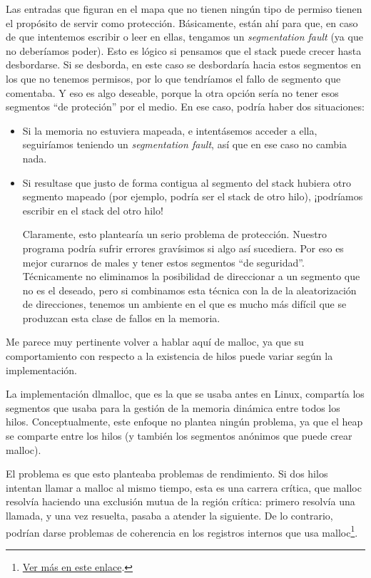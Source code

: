 \documentclass[a4paper]{article}
\begin{document}
Las entradas que figuran en el mapa que no tienen ningún tipo de permiso tienen el propósito de servir como protección. Básicamente, están ahí para que, en caso de que intentemos escribir o leer en ellas, tengamos un \emph{segmentation fault} (ya que no deberíamos poder). Esto es lógico si pensamos que el stack puede crecer hasta desbordarse. Si se desborda, en este caso se desbordaría hacia estos segmentos en los que no tenemos permisos, por lo que tendríamos el fallo de segmento que comentaba. Y eso es algo deseable, porque la otra opción sería no tener esos segmentos ``de proteción'' por el medio. En ese caso, podría haber dos situaciones:
\begin{itemize}
    \item Si la memoria no estuviera mapeada, e intentásemos acceder a ella, seguiríamos teniendo un \emph{segmentation fault}, así que en ese caso no cambia nada.
    \item Si resultase que justo de forma contigua al segmento del stack hubiera otro segmento mapeado (por ejemplo, podría ser el stack de otro hilo), ¡podríamos escribir en el stack del otro hilo!
    
    Claramente, esto plantearía un serio problema de protección. Nuestro programa podría sufrir errores gravísimos si algo así sucediera. Por eso es mejor curarnos de males y tener estos segmentos ``de seguridad''. Técnicamente no eliminamos la posibilidad de direccionar a un segmento que no es el deseado, pero si combinamos esta técnica con la de la aleatorización de direcciones, tenemos un ambiente en el que es mucho más difícil que se produzcan esta clase de fallos en la memoria.
\end{itemize}

Me parece muy pertinente volver a hablar aquí de {\ttfamily malloc}, ya que su comportamiento con respecto a la existencia de hilos puede variar según la implementación.

La implementación {\ttfamily dlmalloc}, que es la que se usaba antes en Linux, compartía los segmentos que usaba para la gestión de la memoria dinámica entre todos los hilos. Conceptualmente, este enfoque no plantea ningún problema, ya que el heap se comparte entre los hilos (y también los segmentos anónimos que puede crear {\ttfamily malloc}).

El problema es que esto planteaba problemas de rendimiento. Si dos hilos intentan llamar a {\ttfamily malloc} al mismo tiempo, esta es una carrera crítica, que {\ttfamily malloc} resolvía haciendo una exclusión mutua de la región crítica: primero resolvía una llamada, y una vez resuelta, pasaba a atender la siguiente. De lo contrario, podrían darse problemas de coherencia en los registros internos que usa {\ttfamily malloc}\footnote{\href{https://sploitfun.wordpress.com/2015/02/10/understanding-glibc-malloc/}{Ver más en este enlace}.}.
\end{document}
